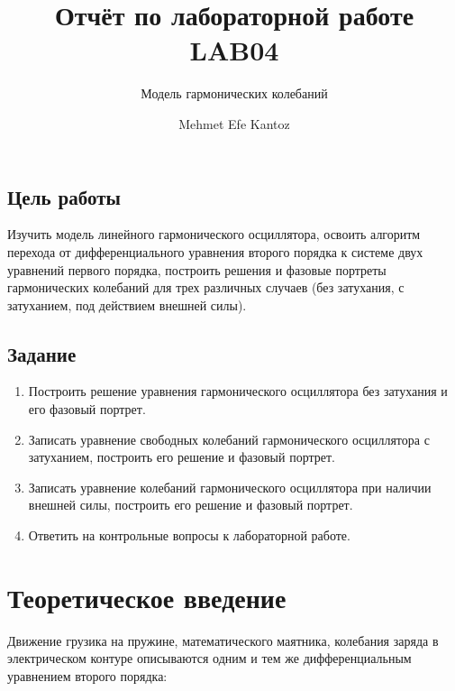 \documentclass[
  english,
  russian,
  12pt,
  a4paper,
  DIV=11,
  numbers=noendperiod]{scrreprt}
\title{Отчёт по лабораторной работе LAB04}
\subtitle{Модель гармонических колебаний}
\author{Mehmet Efe Kantoz}
\date{}
\providecommand{\tightlist}{%
  \setlength{\itemsep}{0pt}\setlength{\parskip}{0pt}}
\renewcommand*\contentsname{Содержание}
\newcommand\contentsname{Содержание}
\begin{document}
\maketitle

\renewcommand*\contentsname{Содержание}
{
\setcounter{tocdepth}{1}
\tableofcontents
}
\listoffigures
\listoftables

\section{Цель
работы}\label{ux446ux435ux43bux44c-ux440ux430ux431ux43eux442ux44b}

Изучить модель линейного гармонического осциллятора, освоить алгоритм
перехода от дифференциального уравнения второго порядка к системе двух
уравнений первого порядка, построить решения и фазовые портреты
гармонических колебаний для трех различных случаев (без затухания, с
затуханием, под действием внешней силы).

\section{Задание}\label{ux437ux430ux434ux430ux43dux438ux435}

\begin{enumerate}
\def\labelenumi{\arabic{enumi}.}
\tightlist
\item
  Построить решение уравнения гармонического осциллятора без затухания и
  его фазовый портрет.
\item
  Записать уравнение свободных колебаний гармонического осциллятора с
  затуханием, построить его решение и фазовый портрет.
\item
  Записать уравнение колебаний гармонического осциллятора при наличии
  внешней силы, построить его решение и фазовый портрет.
\item
  Ответить на контрольные вопросы к лабораторной работе.
\end{enumerate}

\chapter{Теоретическое
введение}\label{ux442ux435ux43eux440ux435ux442ux438ux447ux435ux441ux43aux43eux435-ux432ux432ux435ux434ux435ux43dux438ux435}

Движение грузика на пружине, математического маятника, колебания заряда
в электрическом контуре описываются одним и тем же дифференциальным
уравнением второго порядка:
\end{document}
